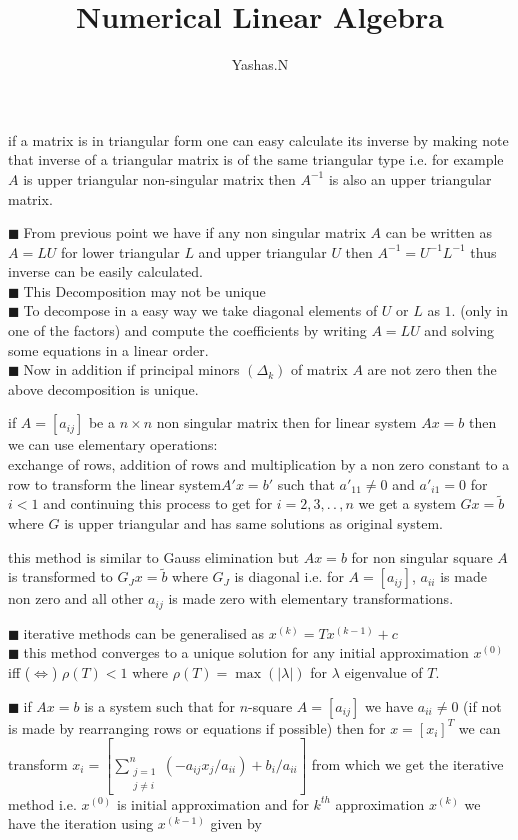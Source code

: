 \documentclass[11pt]{extarticle}
\author{Yashas.N}
\title{Numerical Linear Algebra}
\date{}
\newcommand{\ck}{.\,.\,}
\newcommand{\sm}[2]{\displaystyle\sum_{#1}^{#2}}
\newcommand{\tm}{\times}
\newcommand{\snote}[1]{{\footnotesize(#1)}}
\newcommand{\tbx}[2][]{
\begin{tcolorbox}[enhanced,breakable,size=small,colback=black!2!white,title={#1},arc is angular, arc=1.5mm,drop fuzzy shadow]
	#2
\end{tcolorbox}
}
\newcommand{\y}{$\blacksquare\;$}
\begin{document}
\maketitle
	\begin{multicols}{2}
		\tbx[]{if a matrix is in triangular form one can easy calculate its inverse by making note that inverse of a triangular 
			matrix is of the same triangular type i.e. for example $ A $ is upper triangular non-singular matrix then 
			$ A^{-1} $ is also an upper triangular matrix.}
			\tbx[$LU$ Decomposition]{
				\y From previous point we have if any non singular matrix $ A $ can be written as $ A=LU $ for lower triangular $ L $ and upper triangular $ U $ then $ A^{-1}=U^{-1}L^{-1} $ thus inverse can be easily calculated.\\  
				\y This Decomposition may not be unique\\
				\y To decompose in a easy way we take diagonal elements of $ U $ or $ L $ as $ 1. $ (only in one of the factors) and compute the coefficients by writing $ A=LU $ and solving some equations  in a linear order.\\
				\y Now in addition if principal minors $ (\Delta_k) $ of matrix $ A $ are not zero then the above decomposition is unique.}
				\tbx[Gauss elimination]{
				if $ A=[a_{ij}] $ be a $ n\tm n $ non singular matrix then for linear system $ Ax=b$ then we can use elementary operations:\\
				exchange of rows, addition of rows and multiplication by a non zero constant to a row to transform the  linear system$A'x=b'$ such that $ a'_{11}\neq 0  $ and $ a'_{i1}=0 $ for $ i<1 $  and continuing this process to get for $ i= 2,3,\ck, n$ we get a system $ Gx=\tilde{b} $ where $ G $ is upper triangular and has same solutions as original system.}
				\tbx[Gauss-Jordan method]{ this method is similar to Gauss elimination but $ Ax=b $ for non singular square $ A $ is transformed to $ G_Jx=\tilde{b} $ where $ G_J $ is diagonal i.e. for $ A=[a_{ij}] $, $ a_{ii} $ is made non zero and all other $ a_{ij} $ is made zero with elementary transformations.}
			  \tbx[General Iterative methods]{
			  \y iterative methods can be generalised as $ x^{(k)} =Tx^{(k-1)}+c$ \\
			  \y this method converges to a unique solution for any initial approximation $ x^{(0)} $ iff \snote{$\iff$} $ \rho(T)<1$ where $\rho(T)=\max(|\lambda|) $ for $ \lambda $ eigenvalue of $ T. $ }
				\tbx[Jacobi's Method]{\y if $ Ax=b $ is a system such that for $ n $-square $ A=[a_{ij}] $ we have $ a_{ii}\neq 0 $ \snote{if not is made by rearranging rows or equations if possible} then for $ x=[x_i]^T $ we can transform $ x_i=  \left[\sm{\substack{j=1 \\  j\neq i}}{n}(-a_{ij}x_j/a_{ii}) +b_i/a_{ii}\right]$ from which we get the iterative method i.e. $ x^{(0)} $ is initial approximation and for $ k^{th} $ approximation $ x^{(k)} $ we have the iteration using $ x^{(k-1)} $ given by
}
\end{multicols}
\end{document}
